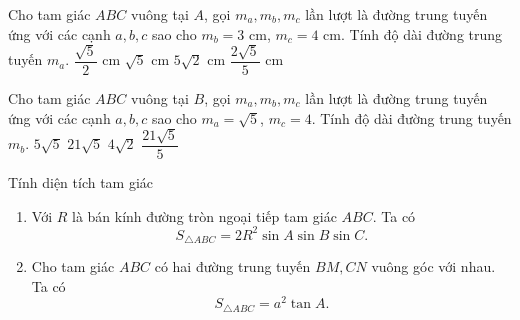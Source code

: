 \begin{vd}%
	Cho tam giác $ABC$ vuông tại $A$, gọi $m_a,m_b,m_c$ lần lượt là đường trung tuyến ứng với các cạnh $a,b,c$ sao cho $m_b=3$ cm, $m_c= 4$ cm. Tính độ dài đường trung tuyến $m_a$.
	\choice
	{$\dfrac{\sqrt{5}}{2}$ cm}
	{\True$\sqrt{5}$ cm}
	{$5\sqrt{2}$ cm}
	{$\dfrac{2\sqrt{5}}{5}$ cm}
\end{vd}

\begin{vd}%
	Cho tam giác $ABC$ vuông tại $B$, gọi $m_a,m_b,m_c$ lần lượt là đường trung tuyến ứng với các cạnh $a,b,c$ sao cho $m_a=\sqrt{5}$, $m_c= 4$. Tính độ dài đường trung tuyến $m_b$.
	\choice
	{$5\sqrt{5}$}
	{$21\sqrt{5}$}
	{$4\sqrt{2}$}
	{\True$\dfrac{21\sqrt{5}}{5}$}
\end{vd}

\begin{dang}{Tính diện tích tam giác}
	\begin{enumerate}
		\item Với $R$ là bán kính đường tròn ngoại tiếp tam giác $ABC$. Ta có
	$$S_{\triangle ABC}=2R^2\sin A\sin B\sin C.$$ 
		\item Cho tam giác $ABC$ có hai đường trung tuyến $BM,CN$ vuông góc với nhau. Ta có
		$$S_{\triangle ABC}={a^2}\tan A.$$
	\end{enumerate}
\end{dang}

